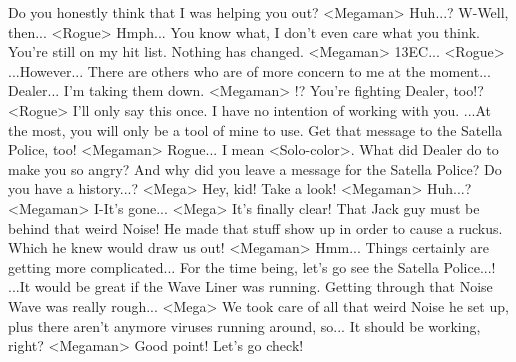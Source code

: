Do you honestly think that I was helping you out? 
<Megaman> Huh...? 
W-Well, then... 
<Rogue> Hmph... 
You know what, I don't even care what you think. 
You're still on my hit list. 
Nothing has changed. 
<Megaman> {13}{EC}... 
<Rogue> ...However... 
There are others who are of more concern to me at the moment... 
Dealer... I'm taking them down. 
<Megaman> !? 
You're fighting Dealer, too!? 
<Rogue> I'll only say this once. I have no intention of working with you. 
...At the most, you will only be a tool of mine to use. 
Get that message to the Satella Police, too! 
<Megaman> Rogue... I mean <Solo-color>. 
What did Dealer do to make you so angry? 
And why did you leave a message for the Satella Police? 
Do you have a history...? 
<Mega> Hey, kid! Take a look! 
<Megaman> Huh...? 
<Megaman> I-It's gone... 
<Mega> It's finally clear! 
That Jack guy must be behind that weird Noise! 
He made that stuff show up in order to cause a ruckus. 
Which he knew would draw us out! 
<Megaman> Hmm... 
Things certainly are getting more complicated... 
For the time being, let's go see the Satella Police...! 
...It would be great if the Wave Liner was running. 
Getting through that Noise Wave was really rough... 
<Mega> We took care of all that weird Noise he set up, plus 
there aren't anymore viruses running around, so... 
It should be working, right? 
<Megaman> Good point! Let's go check! 
